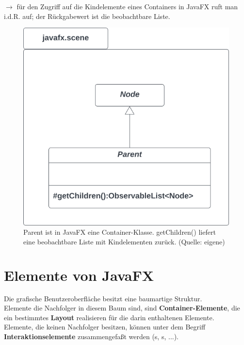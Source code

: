 \noindent
$\rightarrow$ für den Zugriff auf die Kindelemente eines Containers in JavaFX ruft man i.d.R.  auf; der Rückgabewert ist die beobachtbare Liste.

\begin{figure}
    \centering
    \includegraphics[scale=0.5]{chapters/fopt3/img/javafx/nodeparent}
    \caption{Parent ist in JavaFX eine Container-Klasse. getChildren() liefert eine beobachtbare Liste mit Kindelementen zurück. (Quelle: eigene)}
    \label{fig:nodeparent}
\end{figure}

\section{Elemente von JavaFX}

Die grafische Benutzeroberfläche besitzt eine baumartige Struktur.\\

\noindent
Elemente die Nachfolger in diesem Baum sind, sind \textbf{Container-Elemente}, die ein bestimmtes \textbf{Layout} realisieren für die darin enthaltenen Elemente.\\

\noindent
Elemente, die keinen Nachfolger besitzen, können unter dem Begriff \textbf{Interaktionselemente} zusammengefaßt werden (s, s, ...).

